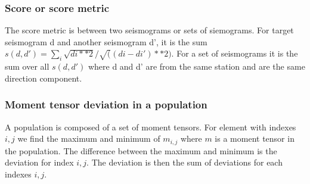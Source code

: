 \documentclass{article}
\begin{document}
\subsubsection*{Score or score metric}
The score metric is between two seismograms or sets of siemograms. For target seismogram d and another seismogram d', it is the sum $s(d,d') = \sum_{i} \sqrt{di**2}/\sqrt((di - di')**2)$. For a set of seismograms it is the sum over all $s(d,d')$ where d and d' are from the same station and are the same direction component.

\subsubsection*{Moment tensor deviation in a population}
A population is composed of a set of moment tensors. For element with indexes $i,j$ we find the maximum and minimum of $m_{i,j}$ where $m$ is a moment tensor in the population. The difference between the maximum and minimum is the deviation for index $i,j$. The deviation is then the sum of deviations for each indexes $i,j$.
\end{document}
